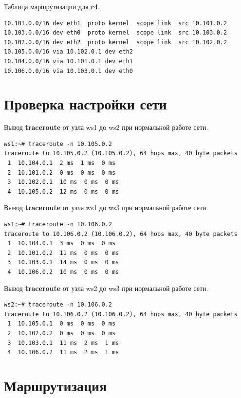 \documentclass[a4paper,12pt]{article}
\begin{document}
Таблица маршрутизации для \textbf{r4}.

\begin{Verbatim}
10.101.0.0/16 dev eth1  proto kernel  scope link  src 10.101.0.2 
10.103.0.0/16 dev eth0  proto kernel  scope link  src 10.103.0.2 
10.102.0.0/16 dev eth2  proto kernel  scope link  src 10.102.0.2 
10.105.0.0/16 via 10.102.0.1 dev eth2 
10.104.0.0/16 via 10.101.0.1 dev eth1 
10.106.0.0/16 via 10.103.0.1 dev eth0 
\end{Verbatim}


\section{Проверка настройки сети}

Вывод \textbf{traceroute} от узла ws1 до ws2 при нормальной работе сети.

\begin{Verbatim}
ws1:~# traceroute -n 10.105.0.2
traceroute to 10.105.0.2 (10.105.0.2), 64 hops max, 40 byte packets
 1  10.104.0.1  2 ms  1 ms  0 ms
 2  10.101.0.2  0 ms  0 ms  0 ms
 3  10.102.0.1  10 ms  0 ms  0 ms
 4  10.105.0.2  12 ms  0 ms  0 ms
\end{Verbatim}

Вывод \textbf{traceroute} от узла ws1 до ws3 при нормальной работе сети.

\begin{Verbatim}
ws1:~# traceroute -n 10.106.0.2
traceroute to 10.106.0.2 (10.106.0.2), 64 hops max, 40 byte packets
 1  10.104.0.1  3 ms  0 ms  0 ms
 2  10.101.0.2  11 ms  0 ms  0 ms
 3  10.103.0.1  14 ms  0 ms  0 ms
 4  10.106.0.2  10 ms  0 ms  0 ms
\end{Verbatim}

Вывод \textbf{traceroute} от узла ws2 до ws3 при нормальной работе сети.

\begin{Verbatim}
ws2:~# traceroute -n 10.106.0.2
traceroute to 10.106.0.2 (10.106.0.2), 64 hops max, 40 byte packets
 1  10.105.0.1  0 ms  0 ms  0 ms
 2  10.102.0.2  0 ms  0 ms  0 ms
 3  10.103.0.1  11 ms  2 ms  1 ms
 4  10.106.0.2  11 ms  2 ms  1 ms
\end{Verbatim}


\section{Маршрутизация}
\end{document}
